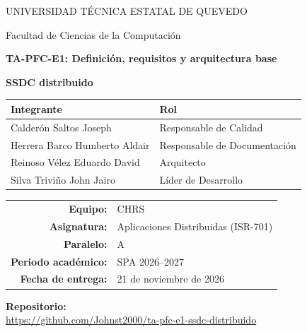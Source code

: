 \documentclass[12pt,a4paper]{article}
\newcommand{\proyecto}{SSDC distribuido} %
\newcommand{\repo}{https://github.com/Johnst2000/ta-pfc-e1-ssdc-distribuido}
\newcommand{\fechaentrega}{21 de noviembre de 2026}
\begin{document}
\hypersetup{pageanchor=false}
\begin{titlepage}
  \centering
  {\large UNIVERSIDAD TÉCNICA ESTATAL DE QUEVEDO\par}
  \vspace{0.3cm}
  {\large Facultad de Ciencias de la Computación\par}
  \vspace{2cm}
  {\Large\bfseries TA-PFC-E1: Definición, requisitos y arquitectura base\par}
  \vspace{0.5cm}
  {\LARGE\bfseries \proyecto\par}
  \vspace{2cm}
  \begin{tabular}{ll}
    \toprule
    \textbf{Integrante} & \textbf{Rol} \\
    \midrule
    Calderón Saltos Joseph            & Responsable de Calidad \\
    Herrera Barco Humberto Aldair     & Responsable de Documentación \\
    Reinoso Vélez Eduardo David       & Arquitecto \\
    Silva Triviño John Jairo          & Líder de Desarrollo \\
    \bottomrule
  \end{tabular}
  \vfill
  \begin{tabular}{rl}
    \textbf{Equipo:}            & CHRS \\
    \textbf{Asignatura:}        & Aplicaciones Distribuidas (ISR-701) \\
    \textbf{Paralelo:}          & A \\
    \textbf{Periodo académico:} & SPA 2026--2027 \\
    \textbf{Fecha de entrega:}  & \fechaentrega \\
  \end{tabular}
  \vspace{1cm}

  \textbf{Repositorio:}\\
  \url{\repo}
\end{titlepage}
\hypersetup{pageanchor=true}

\tableofcontents
\newpage





\end{document}
